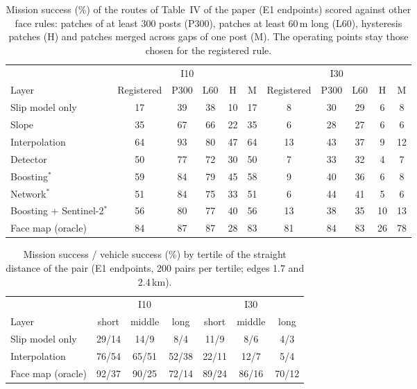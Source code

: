\documentclass[10pt]{article}
\begin{document}
\begin{table}[H]
\caption{Mission success (\%) of the routes of Table~IV of the paper (E1 endpoints) scored against other face rules: patches of at least 300 posts (P300), patches at least 60\,m long (L60), hysteresis patches (H) and patches merged across gaps of one post (M). The operating points stay those chosen for the registered rule.}
\label{tab:labels}
\centering\scriptsize
\setlength{\tabcolsep}{3pt}
\begin{tabular}{@{}lcccccccccc@{}}
\toprule
 & \multicolumn{5}{c}{I10} & \multicolumn{5}{c}{I30} \\
Layer & Registered & P300 & L60 & H & M & Registered & P300 & L60 & H & M \\
\midrule
Slip model only & 17 & 39 & 38 & 10 & 17 & 8 & 30 & 29 & 6 & 8 \\
Slope & 35 & 67 & 66 & 22 & 35 & 6 & 28 & 27 & 6 & 6 \\
Interpolation & 64 & 93 & 80 & 47 & 64 & 13 & 43 & 37 & 9 & 12 \\
Detector & 50 & 77 & 72 & 30 & 50 & 7 & 33 & 32 & 4 & 7 \\
Boosting$^{*}$ & 59 & 84 & 79 & 45 & 58 & 9 & 40 & 36 & 6 & 8 \\
Network$^{*}$ & 51 & 84 & 75 & 33 & 51 & 6 & 44 & 41 & 5 & 6 \\
Boosting + Sentinel-2$^{*}$ & 56 & 80 & 77 & 40 & 56 & 13 & 38 & 35 & 10 & 13 \\
Face map (oracle) & 84 & 87 & 87 & 28 & 83 & 81 & 84 & 83 & 26 & 78 \\
\bottomrule
\end{tabular}
\end{table}

\begin{table}[H]
\caption{Mission success / vehicle success (\%) by tertile of the straight distance of the pair (E1 endpoints, 200 pairs per tertile; edges 1.7 and 2.4\,km).}
\label{tab:tertiles}
\centering\scriptsize
\begin{tabular}{@{}lcccccc@{}}
\toprule
 & \multicolumn{3}{c}{I10} & \multicolumn{3}{c}{I30} \\
Layer & short & middle & long & short & middle & long \\
\midrule
Slip model only & 29/14 & 14/9 & 8/4 & 11/9 & 8/6 & 4/3 \\
Interpolation & 76/54 & 65/51 & 52/38 & 22/11 & 12/7 & 5/4 \\
Face map (oracle) & 92/37 & 90/25 & 72/14 & 89/24 & 86/16 & 70/12 \\
\bottomrule
\end{tabular}
\end{table}
\end{document}
